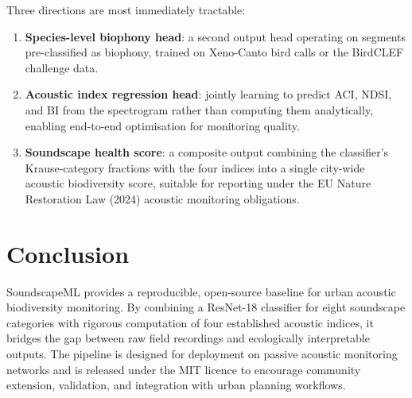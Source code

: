 \documentclass[10pt,twocolumn]{article}
\begin{document}
Three directions are most immediately tractable:
\begin{enumerate}[topsep=2pt, itemsep=1pt]
  \item \textbf{Species-level biophony head}: a second output head operating
        on segments pre-classified as biophony, trained on Xeno-Canto
        bird calls or the BirdCLEF challenge data.
  \item \textbf{Acoustic index regression head}: jointly learning to predict
        ACI, NDSI, and BI from the spectrogram rather than computing them
        analytically, enabling end-to-end optimisation for monitoring quality.
  \item \textbf{Soundscape health score}: a composite output combining the
        classifier's Krause-category fractions with the four indices into a
        single city-wide acoustic biodiversity score, suitable for reporting
        under the EU Nature Restoration Law (2024) acoustic monitoring
        obligations.
\end{enumerate}

\section{Conclusion}

SoundscapeML provides a reproducible, open-source baseline for urban acoustic
biodiversity monitoring. By combining a ResNet-18 classifier for eight
soundscape categories with rigorous computation of four established acoustic
indices, it bridges the gap between raw field recordings and ecologically
interpretable outputs. The pipeline is designed for deployment on passive
acoustic monitoring networks and is released under the MIT licence to
encourage community extension, validation, and integration with urban
planning workflows.
\end{document}
